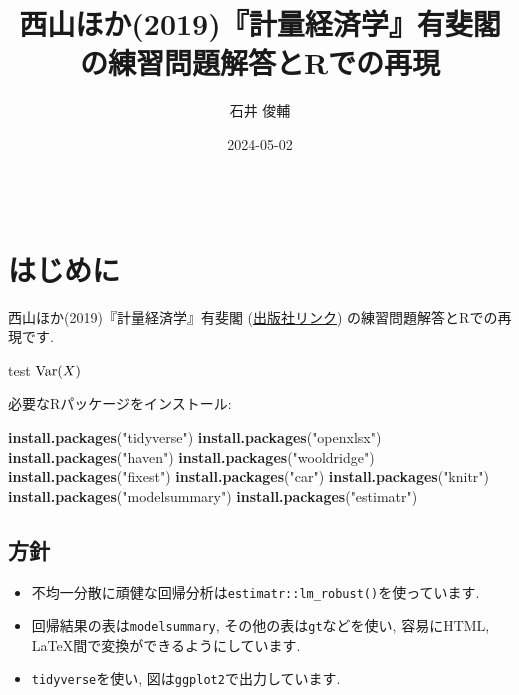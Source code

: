 \documentclass[
]{book}
\title{西山ほか(2019)『計量経済学』有斐閣の練習問題解答とRでの再現}
\author{石井 俊輔}
\date{2024-05-02}
\newenvironment{Shaded}{\begin{snugshade}}{\end{snugshade}}
\newcommand{\FunctionTok}[1]{\textcolor[rgb]{0.13,0.29,0.53}{\textbf{#1}}}
\newcommand{\NormalTok}[1]{#1}
\newcommand{\StringTok}[1]{\textcolor[rgb]{0.31,0.60,0.02}{#1}}
\providecommand{\tightlist}{%
  \setlength{\itemsep}{0pt}\setlength{\parskip}{0pt}}
\begin{document}
\maketitle

{
\setcounter{tocdepth}{1}
\tableofcontents
}
\[
\newcommand{\Var}{\text{Var}}
\]

\hypertarget{ux306fux3058ux3081ux306b}{%
\chapter*{はじめに}\label{ux306fux3058ux3081ux306b}}

西山ほか(2019)『計量経済学』有斐閣 (\href{https://www.yuhikaku.co.jp/books/detail/9784641053854}{出版社リンク}) の練習問題解答とRでの再現です.

test \(\Var(X)\)

必要なRパッケージをインストール:

\begin{Shaded}
\begin{Highlighting}[]
\FunctionTok{install.packages}\NormalTok{(}\StringTok{"tidyverse"}\NormalTok{)}
\FunctionTok{install.packages}\NormalTok{(}\StringTok{"openxlsx"}\NormalTok{)}
\FunctionTok{install.packages}\NormalTok{(}\StringTok{"haven"}\NormalTok{)}
\FunctionTok{install.packages}\NormalTok{(}\StringTok{"wooldridge"}\NormalTok{)}
\FunctionTok{install.packages}\NormalTok{(}\StringTok{"fixest"}\NormalTok{)}
\FunctionTok{install.packages}\NormalTok{(}\StringTok{"car"}\NormalTok{)}
\FunctionTok{install.packages}\NormalTok{(}\StringTok{"knitr"}\NormalTok{)}
\FunctionTok{install.packages}\NormalTok{(}\StringTok{"modelsummary"}\NormalTok{)}
\FunctionTok{install.packages}\NormalTok{(}\StringTok{"estimatr"}\NormalTok{)}
\end{Highlighting}
\end{Shaded}

\hypertarget{ux65b9ux91dd}{%
\section*{方針}\label{ux65b9ux91dd}}

\begin{itemize}
\tightlist
\item
  不均一分散に頑健な回帰分析は\texttt{estimatr::lm\_robust()}を使っています.
\item
  回帰結果の表は\texttt{modelsummary}, その他の表は\texttt{gt}などを使い, 容易にHTML, LaTeX間で変換ができるようにしています.
\item
  \texttt{tidyverse}を使い, 図は\texttt{ggplot2}で出力しています.
\end{itemize}
\end{document}

